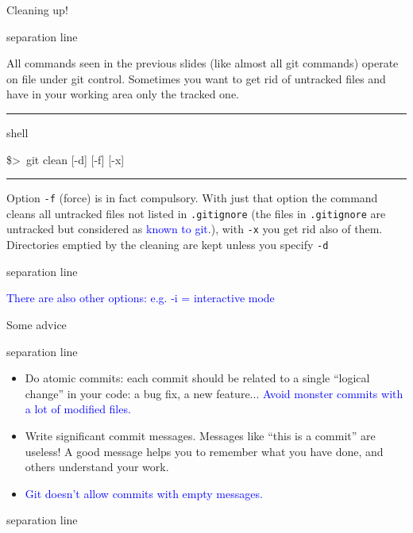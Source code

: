 \documentclass[hyperref={colorlinks}]{beamer}
\newenvironment{shell}{%
\footnotesize\flushleft\hrule height 0.1ex
\tt\begin{beamercolorbox}[sep=1ex,left]{shell}%
}{%
\end{beamercolorbox}
\hrule height 0.1ex
\endflushleft\par
}
\newcommand*{\psone}[1][ant]{\$>~}
\newcommand{\titleline}[1][0.025cm]{%
\begin{beamercolorbox}[wd=\paperwidth,ht=#1,center]{separation line}%
\end{beamercolorbox}%
}
\begin{document}
\begin{frame}{Cleaning up!}
  \titleline
  All commands seen in the previous slides (like almost all git commands) operate on file under git control.
  Sometimes you want to get rid of \alert{untracked files} and have in your working area only
  the tracked one.
\begin{shell}
\psone git clean [-d] [-f] [-x]
\end{shell}

Option \texttt{-f} (force) is in fact \alert{compulsory}. With just that option the command cleans all untracked files not listed in \texttt{.gitignore} (the files in \texttt{.gitignore} are untracked but considered as \textcolor{blue}{known to git}.), with \texttt{-x} you get rid also of them. Directories emptied by the cleaning are kept unless you specify \texttt{-d}
\titleline

\textcolor{blue}{There are also other options: e.g. -i = interactive mode}

\end{frame}

\begin{frame}{Some advice}
\titleline
\begin{itemize}
\item \alert{Do atomic commits}: each commit should be related to a single ``logical change'' in your code: a bug fix, a new feature... \textcolor{blue}{Avoid monster commits with a lot of modified files.}
\item \alert{Write significant commit messages}. Messages like ``this is a commit'' are useless! A good message helps you to remember what you have done, and others understand your work. 
\item \textcolor{blue}{Git doesn't allow commits with empty messages.}
\end{itemize}
\titleline
\end{frame}
\end{document}
